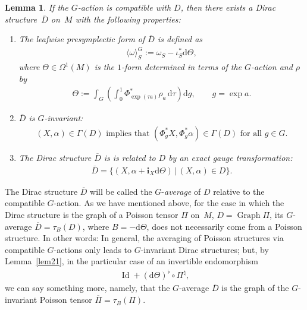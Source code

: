 \documentclass[10pt,a4paper]{amsart}
\numberwithin{equation}{section}
\newtheorem{Lemma}[Theorem]{Lemma}
\begin{document}
\begin{Lemma}\label{lema22}
If the $G$-action is compatible with $D$, then there exists a Dirac structure~$\overline{D}$ on~$M$ with the following properties:
\begin{enumerate}[$(a)$]\itemsep=0pt
\item The leafwise presymplectic form of $\overline{D}$ is defined as
\begin{gather*}
\langle \omega \rangle^{G}_S:=\omega_S -\iota^*_S \mathrm{d}\Theta,
\end{gather*}
where $\Theta\in\Omega^{1}(M)$ is the $1$-form determined in terms of the $G$-action and $\rho$ by
\begin{gather}
\Theta:=\int_G \left(
\int^1_0 \Phi_{\exp(\tau a)}^{\ast}\rho_{a}\,\mathrm{d}\tau\right) \mathrm{d}g,\qquad g=\exp a.\label{MF}
\end{gather}
\item $\overline{D}$ is $G$-invariant:
\begin{gather*}
(X,\alpha)\in\Gamma(D)\mbox{ implies that }(\Phi_{g}^{\ast}X,\Phi_{g}^{\ast} \alpha)\in\Gamma(D)\mbox{ for all }g\in G.
\end{gather*}
\item The Dirac structure $\overline{D}$ is is related to $D$ by an exact gauge transformation:
\begin{gather*}
\overline{D}=\{(X,\alpha+\mathbf{i}_{X}\mathrm{d}\Theta)\,|\, (X,\alpha)\in D\}.
\end{gather*}
\end{enumerate}
\end{Lemma}

The Dirac structure $\overline{D}$ will be called the $G$-\emph{average} of $D$ relative to the compatible $G$-action. As we have mentioned above, for the case in which the Dirac structure is the graph of a Poisson tensor $\Pi$ on~$M$, $D=\operatorname*{Graph}\Pi$, its $G$-average $\overline{D}=\tau_{B}(D)$, where $B=-\mathrm{d}\Theta$, does not necessarily come from a Poisson structure. In other words: In general, the averaging of Poisson structures via compatible $G$-actions only leads to $G$-invariant Dirac structures; but, by Lemma~\ref{lem21}, in the particular case of an invertible endomorphism
\begin{gather*}
\operatorname{Id}+(\mathrm{d}\Theta)^{\flat}\circ\Pi^{\natural},
\end{gather*}
we can say something more, namely, that the $G$-average $\overline{D}$ is the graph of the $G$-invariant Poisson tensor $\overline{\Pi}=\tau_{B}(\Pi)$.
\end{document}
